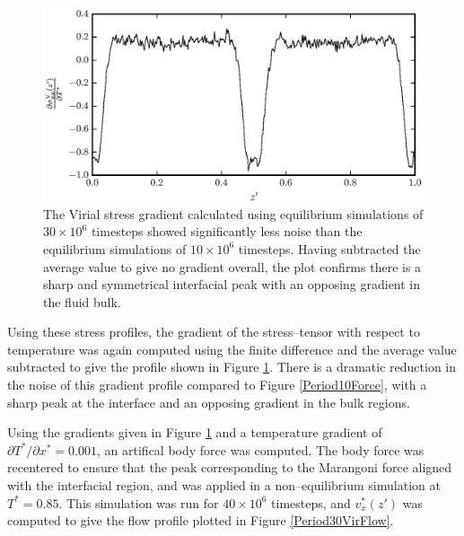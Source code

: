 \begin{figure}[h]
\centering
\includegraphics[scale=0.8]{Period30VirForce}
\caption{The Virial stress gradient calculated using equilibrium simulations of $30 \times 10^{6}$ timesteps showed significantly less noise than the equilibrium simulations of $10 \times 10^{6}$ timesteps.
Having subtracted the average value to give no gradient overall, the plot confirms there is a sharp and symmetrical interfacial peak with an opposing gradient in the fluid bulk.
}
\label{Period30VirForce}
\end{figure}
Using these stress profiles, the gradient of the stress--tensor with respect to temperature was again computed using the finite difference and the average value subtracted to give the profile shown in Figure \ref{Period30VirForce}.
There is a dramatic reduction in the noise of this gradient profile compared to Figure \ref{Period10Force}, with a sharp peak at the interface and an opposing gradient in the bulk regions.
\FloatBarrier

Using the gradients given in Figure \ref{Period30VirForce} and a temperature gradient of $\partial T^{*} / \partial x^{*} = 0.001$, an artifical body force was computed.
The body force was recentered to ensure that the peak corresponding to the Marangoni force aligned with the interfacial region, and was applied in a non--equilibrium simulation at $T^{*} = 0.85$.
This simulation was run for $40 \times 10^{6}$ timesteps, and $v^{*}_x(z')$ was computed to give the flow profile plotted in Figure \ref{Period30VirFlow}.


